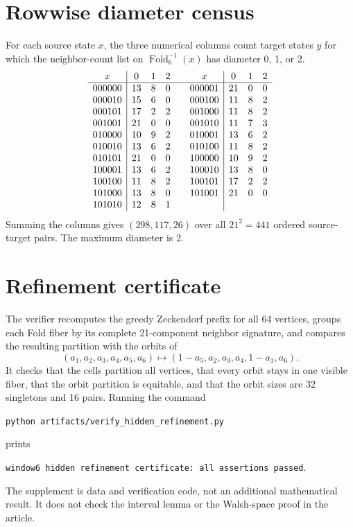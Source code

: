 \documentclass[11pt]{article}
\newcommand{\Fold}{\operatorname{Fold}}
\begin{document}
\section*{Rowwise diameter census}
For each source state \(x\), the three numerical columns count target states \(y\) for
which the neighbor-count list on \(\Fold_6^{-1}(x)\) has diameter 0, 1, or 2.
\[
\begin{array}{c|ccc@{\qquad}c|ccc}
x&0&1&2&x&0&1&2\\ \hline
000000&13&8&0&000001&21&0&0\\
000010&15&6&0&000100&11&8&2\\
000101&17&2&2&001000&11&8&2\\
001001&21&0&0&001010&11&7&3\\
010000&10&9&2&010001&13&6&2\\
010010&13&6&2&010100&11&8&2\\
010101&21&0&0&100000&10&9&2\\
100001&13&6&2&100010&13&8&0\\
100100&11&8&2&100101&17&2&2\\
101000&13&8&0&101001&21&0&0\\
101010&12&8&1&&&&
\end{array}
\]
Summing the columns gives \((298,117,26)\) over all \(21^2=441\) ordered
source-target pairs.  The maximum diameter is 2.

\section*{Refinement certificate}
The verifier recomputes the greedy Zeckendorf prefix for all 64 vertices, groups each
Fold fiber by its complete 21-component neighbor signature, and compares the resulting
partition with the orbits of
\[
(a_1,a_2,a_3,a_4,a_5,a_6)\longmapsto(1-a_5,a_2,a_3,a_4,1-a_1,a_6).
\]
It checks that the cells partition all vertices, that every orbit stays in one visible
fiber, that the orbit partition is equitable, and that the orbit sizes are 32 singletons
and 16 pairs.  Running the command
\begin{center}
\texttt{python artifacts/verify\_hidden\_refinement.py}
\end{center}
prints
\begin{center}
\texttt{window6 hidden refinement certificate: all assertions passed}.
\end{center}

The supplement is data and verification code, not an additional mathematical result.
It does not check the interval lemma or the Walsh-space proof in the article.
\end{document}
